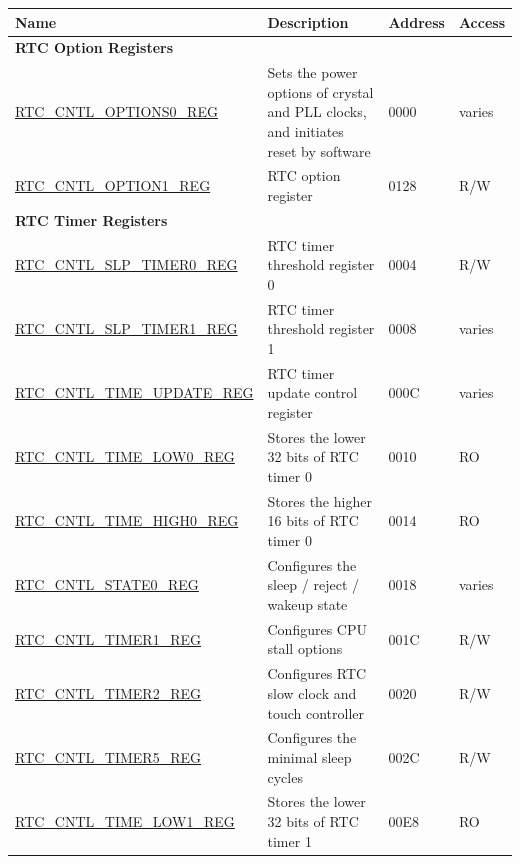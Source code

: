 \begin{longtable}{ | p{6.5cm} | p{6.8cm} | p{1.3cm} | p{1cm} | }
\hline\rowcolor{lightgray}
Name & Description &  Address & Access \\ \hline
\endhead
\multicolumn{4}{|l|}{\textbf{RTC Option Registers}} \\ \hline
\hyperref[regdesc:RTCCNTLOPTIONS0REG]{RTC\_CNTL\_OPTIONS0\_REG} & Sets the power options of crystal and PLL clocks, and initiates reset by software & \hexprefix{}0000 & varies \\ \hline
\hyperref[regdesc:RTCCNTLOPTION1REG]{RTC\_CNTL\_OPTION1\_REG} & RTC option register & \hexprefix{}0128 & R/W \\ \hline
\multicolumn{4}{|l|}{\textbf{RTC Timer Registers}} \\ \hline
\hyperref[regdesc:RTCCNTLSLPTIMER0REG]{RTC\_CNTL\_SLP\_TIMER0\_REG} & RTC timer threshold register 0 & \hexprefix{}0004 & R/W \\ \hline
\hyperref[regdesc:RTCCNTLSLPTIMER1REG]{RTC\_CNTL\_SLP\_TIMER1\_REG} & RTC timer threshold register 1 & \hexprefix{}0008 & varies \\ \hline
\hyperref[regdesc:RTCCNTLTIMEUPDATEREG]{RTC\_CNTL\_TIME\_UPDATE\_REG} & RTC timer update control register & \hexprefix{}000C & varies \\ \hline
\hyperref[regdesc:RTCCNTLTIMELOW0REG]{RTC\_CNTL\_TIME\_LOW0\_REG} & Stores the lower 32 bits of RTC timer 0  & \hexprefix{}0010 & RO \\ \hline
\hyperref[regdesc:RTCCNTLTIMEHIGH0REG]{RTC\_CNTL\_TIME\_HIGH0\_REG} & Stores the higher 16 bits of RTC timer 0  & \hexprefix{}0014 & RO \\ \hline
\hyperref[regdesc:RTCCNTLSTATE0REG]{RTC\_CNTL\_STATE0\_REG} & Configures the sleep / reject / wakeup state  & \hexprefix{}0018 & varies \\ \hline
\hyperref[regdesc:RTCCNTLTIMER1REG]{RTC\_CNTL\_TIMER1\_REG} & Configures CPU stall options  & \hexprefix{}001C & R/W \\ \hline
\hyperref[regdesc:RTCCNTLTIMER2REG]{RTC\_CNTL\_TIMER2\_REG} & Configures RTC slow clock and touch controller  & \hexprefix{}0020 & R/W \\ \hline
\hyperref[regdesc:RTCCNTLTIMER5REG]{RTC\_CNTL\_TIMER5\_REG} & Configures the minimal sleep cycles  & \hexprefix{}002C & R/W \\ \hline
\hyperref[regdesc:RTCCNTLTIMELOW1REG]{RTC\_CNTL\_TIME\_LOW1\_REG} & Stores the lower 32 bits of RTC timer 1  & \hexprefix{}00E8 & RO \\ \hline

\end{longtable}
